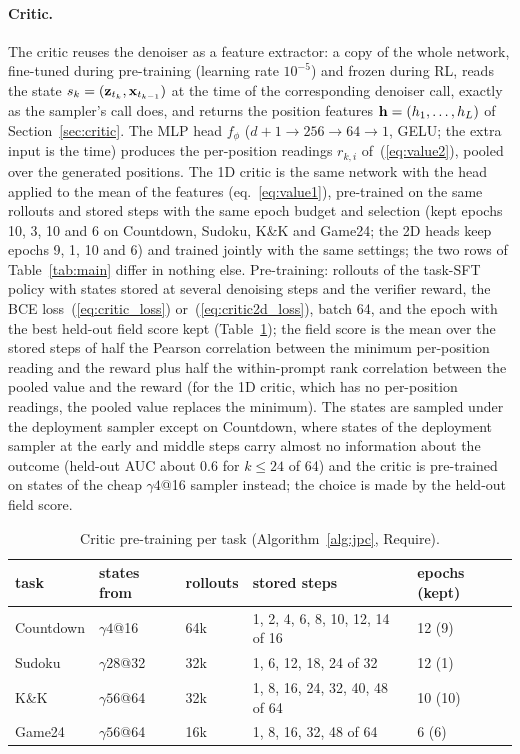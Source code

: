 \paragraph{Critic.}
The critic reuses the denoiser as a feature extractor: a copy of the whole network, fine-tuned during pre-training (learning rate $10^{-5}$) and frozen during RL, reads the state $s_k=({\mathbf{z}}_{t_k},{\mathbf{x}}_{t_{k-1}})$ at the time of the corresponding denoiser call, exactly as the sampler's call does, and returns the position features ${\mathbf{h}}=(h_1,\dots,h_L)$ of Section~\ref{sec:critic}. The MLP head $f_\phi$ ($d{+}1\to256\to64\to1$, GELU; the extra input is the time) produces the per-position readings $r_{k,i}$ of~(\ref{eq:value2}), pooled over the generated positions. The 1D critic is the same network with the head applied to the mean of the features (eq.~\ref{eq:value1}), pre-trained on the same rollouts and stored steps with the same epoch budget and selection (kept epochs 10, 3, 10 and 6 on Countdown, Sudoku, K\&K and Game24; the 2D heads keep epochs 9, 1, 10 and 6) and trained jointly with the same settings; the two rows of Table~\ref{tab:main} differ in nothing else. Pre-training: rollouts of the task-SFT policy with states stored at several denoising steps and the verifier reward, the BCE loss~(\ref{eq:critic_loss}) or~(\ref{eq:critic2d_loss}), batch 64, and the epoch with the best held-out field score kept (Table~\ref{tab:critic_pretrain}); the field score is the mean over the stored steps of half the Pearson correlation between the minimum per-position reading and the reward plus half the within-prompt rank correlation between the pooled value and the reward (for the 1D critic, which has no per-position readings, the pooled value replaces the minimum). The states are sampled under the deployment sampler except on Countdown, where states of the deployment sampler at the early and middle steps carry almost no information about the outcome (held-out AUC about $0.6$ for $k\le24$ of 64) and the critic is pre-trained on states of the cheap $\gamma4$@16 sampler instead; the choice is made by the held-out field score.
\begin{table}[H]\centering\small
\caption{Critic pre-training per task (Algorithm~\ref{alg:jpc}, Require).}\label{tab:critic_pretrain}
\begin{tabular}{@{}lllll@{}}\toprule
task & states from & rollouts & stored steps & epochs (kept)\\\midrule
Countdown & $\gamma4$@16 & 64k & 1, 2, 4, 6, 8, 10, 12, 14 of 16 & 12 (9)\\
Sudoku & $\gamma28$@32 & 32k & 1, 6, 12, 18, 24 of 32 & 12 (1)\\
K\&K & $\gamma56$@64 & 32k & 1, 8, 16, 24, 32, 40, 48 of 64 & 10 (10)\\
Game24 & $\gamma56$@64 & 16k & 1, 8, 16, 32, 48 of 64 & 6 (6)\\\bottomrule\end{tabular}\end{table}

